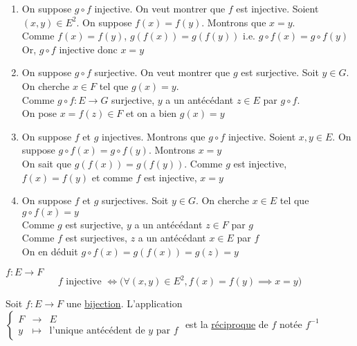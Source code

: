 \begin{prv}
	\begin{enumerate}
		\item On suppose $g \circ f$ injective. On veut montrer que $f$ est injective. Soient $(x,y)\in E^2$. On suppose $f(x)= f(y)$. Montrons que $x=y$.\\
			Comme $f(x) = f(y)$, $g(f(x)) = g(f(y))$ i.e.  $g \circ f(x) = g \circ f(y)$\\
			Or, $g \circ f$ injective donc $x = y$ 
		\item On suppose $g \circ f$ surjective. On veut montrer que $g$ est surjective. Soit $y \in G$. On cherche $x \in F$ tel que $g(x) = y$.\\
			Comme $g \circ f: E\to G$ surjective, $y$ a un antécédant $z \in E$ par $g \circ f$.\\
			On pose $x = f(z) \in F$ et on a bien $g(x) = y$ 
		\item On suppose $f$ et $g$ injectives. Montrons que $g \circ f$ injective. Soient $x,y \in E$. On suppose $g \circ f(x) = g \circ f(y)$. Montrons $x = y$\\
			On sait que  $g(f(x)) = g(f(y))$. Comme $g$ est injective, $f(x) = f(y)$ et comme  $f$ est injective, $x = y$
		\item On suppose  $f$ et $g$ surjectives. Soit $y \in G$. On cherche $x \in E$ tel que $g \circ f(x) = y$\\
			Comme $g$ est surjective, $y$ a un antécédant $z \in F$ par $g$ \\
			Comme $f$ est surjectives, $z$ a un antécédant $x \in E$ par $f$ \\
			On en déduit $g \circ f(x) = g(f(x)) = g(z) = y$
	\end{enumerate}
\end{prv}

\begin{rmk}
	$f: E \longrightarrow F$  \[
		f \text{ injective } \iff \bigg( \forall (x,y) \in E^2, f(x) = f(y) \implies x = y \bigg) 
	\] 
\end{rmk}

\begin{defn}
	Soit $f: E\to F$ une \underline{bijection}.
	L'application $\left\{\begin{array}{rcl}
			F &\longrightarrow& E \\
			y &\longmapsto& \text{l'unique antécédent de $y$ par $f$}
	\end{array}\right.$ est la \underline{réciproque} de $f$ notée $f^{-1}$
\end{defn}

